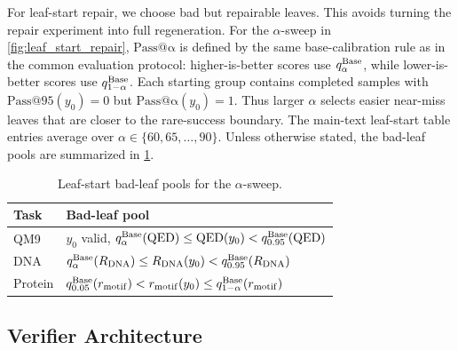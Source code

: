 \documentclass{article}
\numberwithin{theorem}{section}
\numberwithin{proposition}{section}
\numberwithin{corollary}{section}
\numberwithin{lemma}{section}
\numberwithin{conjecture}{section}
\numberwithin{remark}{section}
\numberwithin{definition}{section}
\numberwithin{assumption}{section}
\numberwithin{example}{section}
\begin{document}
For leaf-start repair, we choose bad but repairable leaves. This avoids turning the repair experiment into full regeneration. For the $\alpha$-sweep in \cref{fig:leaf_start_repair}, $\mathrm{Pass@\alpha}$ is defined by the same base-calibration rule as in the common evaluation protocol: higher-is-better scores use \(q_\alpha^{\rm Base}\), while lower-is-better scores use \(q_{1-\alpha}^{\rm Base}\). Each starting group contains completed samples with $\mathrm{Pass@95}(y_0)=0$ but $\mathrm{Pass@\alpha}(y_0)=1$. Thus larger $\alpha$ selects easier near-miss leaves that are closer to the rare-success boundary. The main-text leaf-start table entries average over \(\alpha\in\{60,65,\ldots,90\}\). Unless otherwise stated, the bad-leaf pools are summarized in \cref{tab:leaf_start_bad_leaf_pools}.
\begin{table}[h!]
\centering
\caption{Leaf-start bad-leaf pools for the $\alpha$-sweep.}
\label{tab:leaf_start_bad_leaf_pools}
\vspace{5pt}
\small
\setlength{\tabcolsep}{5pt}
\renewcommand{\arraystretch}{1.08}
\begin{tabular}{@{}ll@{}}
\toprule
Task & Bad-leaf pool \\
\midrule
QM9 & $y_0$ valid, $q_{\alpha}^{\rm Base}(\mathrm{QED})\le \mathrm{QED}(y_0)<q_{0.95}^{\rm Base}(\mathrm{QED})$ \\
DNA & $q_{\alpha}^{\rm Base}(R_{\rm DNA})\le R_{\rm DNA}(y_0)<q_{0.95}^{\rm Base}(R_{\rm DNA})$ \\
Protein & $q_{0.05}^{\rm Base}(r_{\rm motif})< r_{\rm motif}(y_0)\le q_{1-\alpha}^{\rm Base}(r_{\rm motif})$ \\
\bottomrule
\end{tabular}
\end{table}


\subsection{Verifier Architecture}
\label{app:verifier_training_details}
\end{document}
